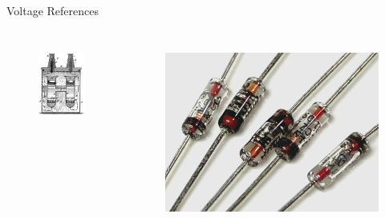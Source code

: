 \documentclass[aspectratio=1610]{beamer} %
\begin{document}
\begin{frame}{Voltage References}
    \begin{columns}[T]
        \begin{figure}
            \centering
            \includegraphics[height=0.3\textheight]{images/standardcell.png}
            \label{fig:standardcell}
        \end{figure}
        \begin{figure}
            \centering
            \includegraphics[height=0.3\textheight]{images/zener.png}
            \label{fig:zener}
        \end{figure}
    \end{columns}
    \vfill
\end{frame}
\end{document}
